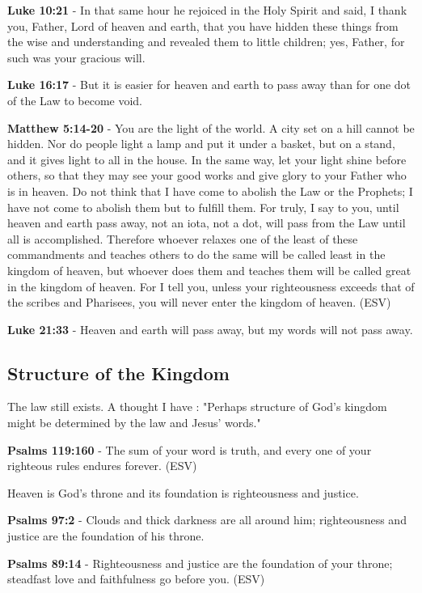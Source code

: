 \documentclass[11pt]{article}
\begin{document}
\textbf{Luke 10:21} - In that same hour he rejoiced in the Holy Spirit and said, I thank you, Father, Lord of heaven and earth, that you have hidden these things from the wise and understanding and revealed them to little children; yes, Father, for such was your gracious will.

\textbf{Luke 16:17} - But it is easier for heaven and earth to pass away than for one dot of the Law to become void.

\textbf{Matthew 5:14-20} - You are the light of the world. A city set on a hill cannot be hidden. Nor do people light a lamp and put it under a basket, but on a stand, and it gives light to all in the house. In the same way, let your light shine before others, so that they may see your good works and give glory to your Father who is in heaven. Do not think that I have come to abolish the Law or the Prophets; I have not come to abolish them but to fulfill them. For truly, I say to you, until heaven and earth pass away, not an iota, not a dot, will pass from the Law until all is accomplished. Therefore whoever relaxes one of the least of these commandments and teaches others to do the same will be called least in the kingdom of heaven, but whoever does them and teaches them will be called great in the kingdom of heaven. For I tell you, unless your righteousness exceeds that of the scribes and Pharisees, you will never enter the kingdom of heaven. (ESV)

\textbf{Luke 21:33} - Heaven and earth will pass away, but my words will not pass away.

\subsection{Structure of the Kingdom}
\label{sec:org3b989a8}

The law still exists. A thought I have : "Perhaps structure of God's kingdom might be determined by the law and Jesus' words."

\textbf{Psalms 119:160} - The sum of your word is truth, and every one of your righteous rules endures forever. (ESV)

Heaven is God's throne and its foundation is righteousness and justice.

\textbf{Psalms 97:2} - Clouds and thick darkness are all around him; righteousness and justice are the foundation of his throne.

\textbf{Psalms 89:14} - Righteousness and justice are the foundation of your throne; steadfast love and faithfulness go before you. (ESV)
\end{document}
